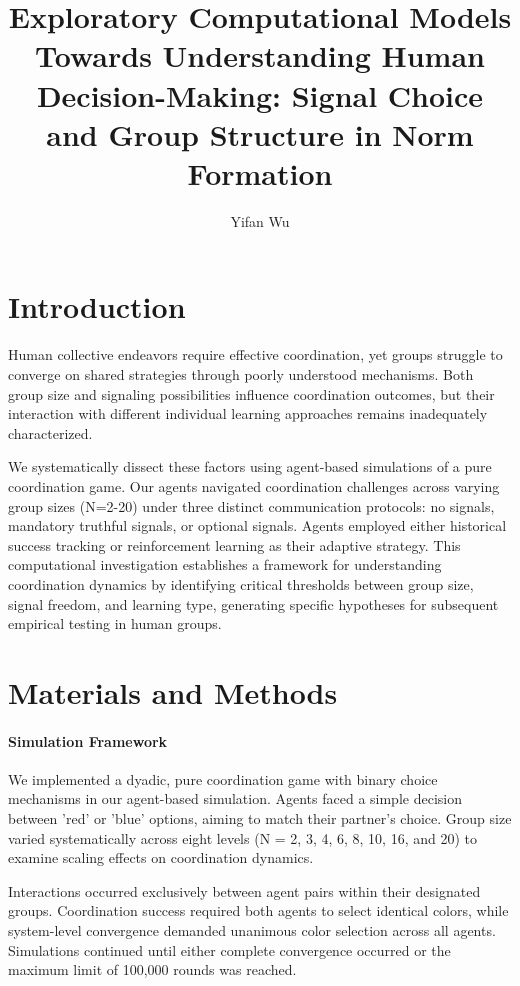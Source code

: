 \documentclass[12pt,a4paper]{article}
\title{Exploratory Computational Models Towards Understanding Human Decision-Making: Signal Choice and Group Structure in Norm Formation}
\author{Yifan Wu}
\date{}
\begin{document}
\maketitle

\section{Introduction}

Human collective endeavors require effective coordination, yet groups struggle to converge on shared strategies through poorly understood mechanisms. Both group size and signaling possibilities influence coordination outcomes, but their interaction with different individual learning approaches remains inadequately characterized.

We systematically dissect these factors using agent-based simulations of a pure coordination game. Our agents navigated coordination challenges across varying group sizes (N=2-20) under three distinct communication protocols: no signals, mandatory truthful signals, or optional signals. Agents employed either historical success tracking or reinforcement learning as their adaptive strategy. This computational investigation establishes a framework for understanding coordination dynamics by identifying critical thresholds between group size, signal freedom, and learning type, generating specific hypotheses for subsequent empirical testing in human groups.

\section{Materials and Methods}
\paragraph{Simulation Framework}
We implemented a dyadic, pure coordination game with binary choice mechanisms in our agent-based simulation. Agents faced a simple decision between 'red' or 'blue' options, aiming to match their partner's choice. Group size varied systematically across eight levels (N = 2, 3, 4, 6, 8, 10, 16, and 20) to examine scaling effects on coordination dynamics.

Interactions occurred exclusively between agent pairs within their designated groups. Coordination success required both agents to select identical colors, while system-level convergence demanded unanimous color selection across all agents. Simulations continued until either complete convergence occurred or the maximum limit of 100,000 rounds was reached.
\end{document}
